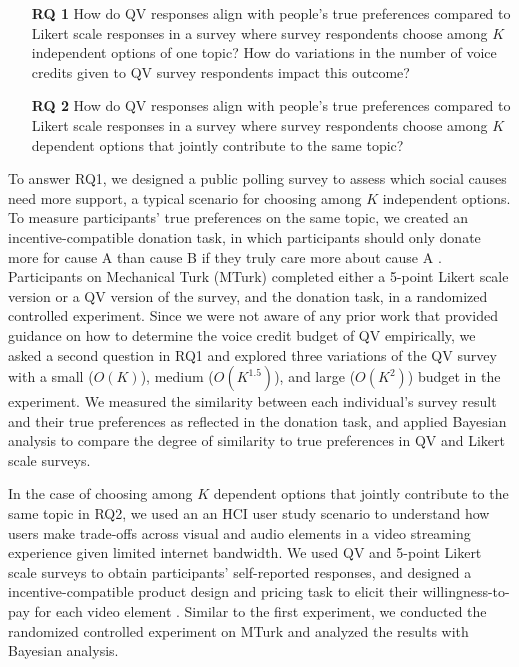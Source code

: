 \begin{itemize}
    \item[\textbf{RQ 1}] How do QV responses align with people's true preferences compared to Likert scale responses in a survey where survey respondents choose among $K$ independent options of one topic? How do variations in the number of voice credits given to QV survey respondents impact this outcome?

    \item[\textbf{RQ 2}] How do QV responses align with people's true preferences compared to Likert scale responses in a survey where survey respondents choose among $K$ dependent options that jointly contribute to the same topic? 
\end{itemize}

To answer RQ1, we designed a public polling survey to assess which social causes need more support, a typical scenario for choosing among $K$ independent options. To measure participants' true preferences on the same topic, we created an incentive-compatible donation task, in which participants should only donate more for cause A than cause B if they truly care more about cause A \cite{champ1997using}. Participants on Mechanical Turk (MTurk) completed either a 5-point Likert scale version or a QV version of the survey, and the donation task, in a randomized controlled experiment. Since we were not aware of any prior work that provided guidance on how to determine the voice credit budget of QV empirically, we asked a second question in RQ1 and explored three variations of the QV survey with a small ($O(K)$), medium ($O(K^{1.5})$), and large ($O(K^2)$) budget in the experiment. We measured the similarity between each individual's survey result and their true preferences as reflected in the donation task, and applied Bayesian analysis to compare the degree of similarity to true preferences in QV and Likert scale surveys.

In the case of choosing among $K$ dependent options that jointly contribute to the same topic in RQ2, we used an an HCI user study scenario to understand how users make trade-offs across visual and audio elements in a video streaming experience given limited internet bandwidth. We used QV and 5-point Likert scale surveys to obtain participants' self-reported responses, and designed a incentive-compatible product design and pricing task to elicit their willingness-to-pay for each video element \cite{roth1982incentive}. Similar to the first experiment, we conducted the randomized controlled experiment on MTurk and analyzed the results with Bayesian analysis.

